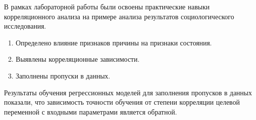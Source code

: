 
В рамках лабораторной работы были освоены практические навыки корреляционного анализа на примере анализа результатов социологического исследования.

\begin{enumerate}[label*=\arabic*.]
	\item Определено влияние признаков причины на признаки состояния.
	\item Выявлены корреляционные зависимости.
	\item Заполнены пропуски в данных.
\end{enumerate}

Результаты обучения регрессионных моделей для заполнения пропусков в данных показали, что зависимость точности обучения от степени корреляции целевой переменной с входными параметрами является обратной.
